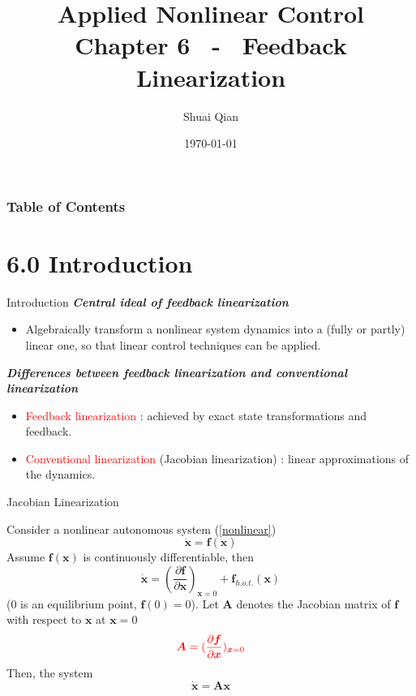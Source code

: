 \documentclass{beamer}
\title{Applied Nonlinear Control \\
        \large Chapter 6 ~-~ Feedback Linearization}
\author{\large Shuai Qian}
\date{\today}
\institute{School of Automation \\
        Nanjing University of Science and Technology}
\renewcommand{\vec}[1]{\ensuremath{\boldsymbol{#1}}} %
\begin{document}
  \maketitle

  \begin{frame}
  \addtocounter{framenumber}{-2}
  \frametitle{Table of Contents}
  \thispagestyle{empty}
  \tableofcontents
  \end{frame}

  \section{6.0  Introduction}

  \begin{frame}{Introduction}
    \textbf{\textit{Central ideal of feedback linearization}}
    \begin{itemize}
      \item Algebraically transform a nonlinear system dynamics into a (fully or partly) linear one, so that linear control techniques can be applied.
    \end{itemize}

    \textbf{\textit{Differences between feedback linearization and conventional linearization}}
    \begin{itemize}
      \item \textcolor{red}{Feedback linearization} : achieved by exact state transformations and feedback.
      \item \textcolor{red}{Conventional linearization} (Jacobian linearization) : linear approximations of the dynamics.
    \end{itemize}
   \end{frame}


   \begin{frame}{Jacobian Linearization}

    Consider a nonlinear autonomous system (\ref{nonlinear})
    \begin{equation}\label{nonlinear}
      \dot{\vec{x}} = \vec{f(x)}
    \end{equation}
    Assume $\vec{f(x)}$ is continuously differentiable, then
    $$
    \dot{\vec{x}} = (\frac{\partial \vec{f}}{\partial \vec{x}})_{\vec{x}=0} + \vec{f}_{h.o.t.}(\vec{x})
    $$
    (0 is an equilibrium point, $\vec{f}(0) = 0$).
    Let $\vec{A}$ denotes the Jacobian matrix of $\vec{f}$ with respect to $\vec{x}$ at $\vec{x}=0$
    $$
    {\color{red}\vec{A} = (\frac{\partial \vec{f}}{\partial \vec{x}})_{\vec{x}=0}}
    $$
    Then, the system
    $$
    \dot{\vec{x}} = \vec{Ax}
    $$
   \end{frame}
\end{document}
